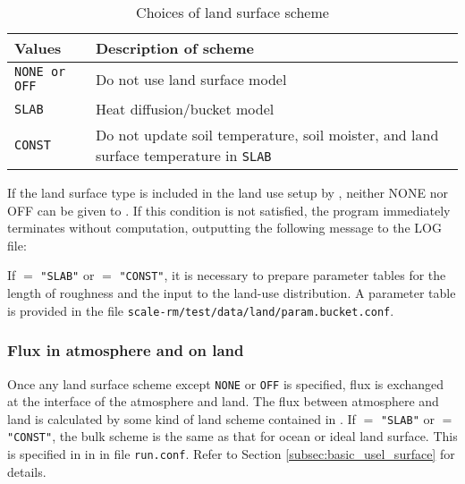 \begin{table}[hbt]
\begin{center}
  \caption{Choices of land surface scheme}
  \label{tab:nml_land}
  \begin{tabularx}{150mm}{lX} \hline
    \rowcolor[gray]{0.9}  Values & Description of scheme \\ \hline
      \verb|NONE or OFF| & Do not use land surface model              \\
      \verb|SLAB|          & Heat diffusion/bucket model                   \\
      \verb|CONST|         & Do not update soil temperature, soil moister, and land surface temperature in \verb|SLAB| \\
    \hline
  \end{tabularx}
\end{center}
\end{table}

If the land surface type is included in the land use setup by , neither NONE nor OFF can be given to . If this condition is not satisfied, the program immediately terminates without computation, outputting the following message to the LOG file:

If  $=$ \verb|"SLAB"| or  $=$ \verb|"CONST"|,
it is necessary to prepare parameter tables for the length of roughness and the input to the land-use distribution.
A parameter table is provided
in the file \verb|scale-rm/test/data/land/param.bucket.conf|.\\


\subsubsection{Flux in atmosphere and on land}
Once any land surface scheme except \verb|NONE| or \verb|OFF| is specified, flux is exchanged at the interface of the atmosphere and land. The flux between atmosphere and land is calculated by some kind of land scheme contained in \scalerm. If  $=$ \verb|"SLAB"| or  $=$ \verb|"CONST"|, the bulk scheme is the same as that for ocean or ideal land surface. This is specified in  in  in file \verb|run.conf|. Refer to Section \ref{subsec:basic_usel_surface} for details.

